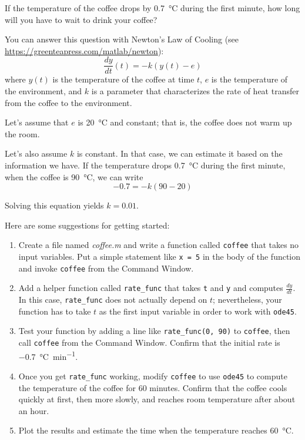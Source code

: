 If the temperature of the coffee drops by \SI{0.7}{\celsius} during the first minute, how long will you have to wait to drink your coffee?

You can answer this question with Newton's Law of Cooling (see \url{https://greenteapress.com/matlab/newton}):
%
\begin{equation*}
\frac{dy}{dt}(t) = -k (y(t) - e)
\end{equation*}
%
where $y(t)$ is the temperature of the coffee at time $t$,
$e$ is the temperature of the environment, and $k$ is a parameter
that characterizes the rate of heat transfer from the coffee to the environment.

Let's assume that $e$ is \SI{20}{\celsius} and constant; that is, the coffee does not warm up the room.

Let's also assume $k$ is constant.  In that case, we can estimate it based on the information we have.  If the temperature drops \SI{0.7}{\celsius} during the first minute, when the coffee is \SI{90}{\celsius}, we can write
%
\begin{equation*}
-0.7 = -k (90 - 20)
\end{equation*}
%

Solving this equation yields $k = 0.01$.

Here are some suggestions for getting started:

\begin{enumerate}

\item Create a file named \emph{coffee.m} and write a function
called \lstinline{coffee} that takes no input variables.  Put a simple statement like \lstinline{x = 5} in the body of the function and invoke \lstinline{coffee} from the Command Window.

\item Add a helper function called \lstinline{rate_func} that takes \lstinline{t} and \lstinline{y} and computes $\frac{dy}{dt}$.  In this case, \lstinline{rate_func} does not actually depend on $t$; nevertheless, your function has to take $t$ as the first input variable in order to work with \lstinline{ode45}.

\item Test your function by adding a line like \lstinline{rate_func(0, 90)}
to \lstinline{coffee}, then call \lstinline{coffee} from the Command Window.
Confirm that the initial rate is \SI{-0.7}{\celsius \per \minute}.

\item Once you get \lstinline{rate_func} working, modify
\lstinline{coffee} to use \lstinline{ode45} to compute the temperature
of the coffee for 60 minutes.  Confirm that
the coffee cools quickly at first, then more slowly, and reaches
room temperature after about an hour.

\item Plot the results and estimate the time when the temperature reaches \SI{60}{\celsius}.

\end{enumerate}





